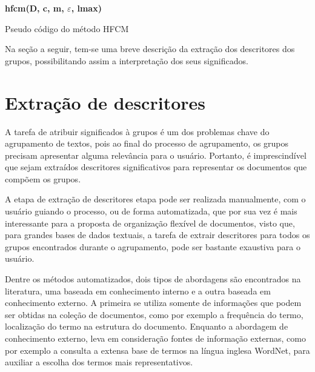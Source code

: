 \begin{algorithm}[!htp]
  \SetAlgoLined 
  \textbf{{\color{blue}hfcm}(D, c, m, $\varepsilon$, lmax)}\\
  \caption{Pseudo código do método HFCM}
  \label{alg:hfcm} 
\end{algorithm}

Na seção a seguir, tem-se uma breve descrição da extração dos descritores dos grupos, possibilitando
assim a interpretação dos seus significados.

\section{Extração de descritores} 

A tarefa de atribuir significados à grupos é um dos problemas chave do agrupamento de textos, pois
ao final do processo de agrupamento, os grupos precisam apresentar alguma relevância para o
usuário\cite{Zhang2008}. Portanto, é imprescindível que sejam extraídos descritores significativos
para representar os documentos que compõem os grupos.

A etapa de extração de descritores etapa pode ser realizada manualmente, com o usuário guiando o
processo, ou de forma automatizada, que por sua vez é mais interessante para a proposta de
organização flexível de documentos, visto que, para grandes bases de dados textuais, a tarefa de
extrair descritores para todos os grupos encontrados durante o agrupamento, pode ser bastante
exaustiva para o usuário.

Dentre os métodos automatizados, dois tipos de abordagens são encontrados na literatura, uma baseada em
conhecimento interno e a outra baseada em conhecimento externo.  A primeira se utiliza somente de
informações que podem ser obtidas na coleção de documentos, como por exemplo a frequência do termo,
localização do termo na estrutura do documento.  Enquanto a abordagem de conhecimento externo, leva
em consideração fontes de informação externas, como por exemplo a consulta a extensa base
de termos na língua inglesa WordNet\footnotemark, para auxiliar a escolha dos termos mais
representativos. 

